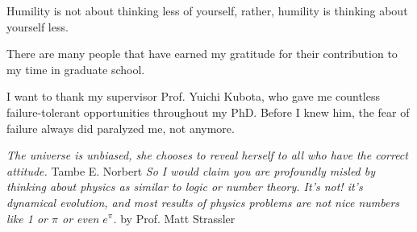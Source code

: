 Humility is not about thinking less of yourself, rather, humility is thinking about yourself less.


There are many people that have earned my gratitude for their contribution to my
time in graduate school. 

I want to thank my supervisor Prof. Yuichi Kubota, who gave me countless failure-tolerant opportunities
throughout my PhD. Before I knew him, the fear of failure always did paralyzed me, not anymore.

\textit{The universe is unbiased, she chooses to reveal herself to all who have the correct attitude.}
\newline
\textsf{Tambe E. Norbert}
\newline
\textit{So I would claim you are profoundly misled by thinking about physics as similar to logic or number theory. It’s not! it’s dynamical evolution, and most results of physics problems are not nice numbers like 1 or $\pi$ or even $e^{\pi}$.}
\newline
\textsf{by Prof. Matt Strassler}


